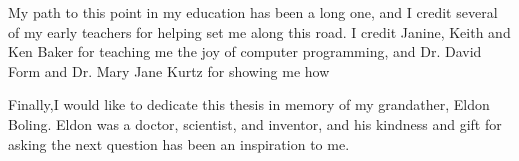 My path to this point in my education has been a long one, and I credit several of my early teachers for helping set me along this road.
I credit Janine, Keith and Ken Baker for teaching me the joy of computer programming, and Dr. David Form and Dr. Mary Jane Kurtz for showing me how %


Finally,I would like to dedicate this thesis in memory of my grandather, Eldon Boling.
Eldon was a doctor, scientist, and inventor, and his kindness and gift for asking the next question has been an inspiration to me. 
